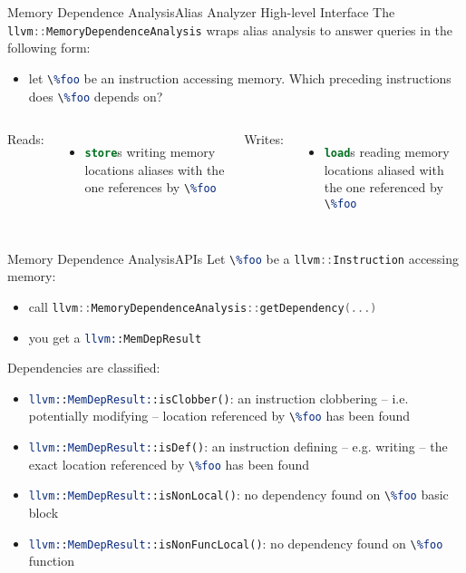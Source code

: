 \documentclass[10pt,mathserif]{beamer}
\newcommand{\cppinline}[1]{\lstinline[language=C++]!#1!}
\newcommand{\llvminline}[1]{\lstinline[language=LLVM]!#1!}
\begin{document}
\begin{frame}{Memory Dependence Analysis}{Alias Analyzer High-level Interface}
The \cppinline{llvm::MemoryDependenceAnalysis} wraps alias analysis to answer
queries in the following form:

\begin{itemize}
\item let \llvminline{\%foo} be an instruction accessing memory. Which
      preceding instructions does \llvminline{\%foo} depends on?
\end{itemize}

\begin{columns}[t]
Reads:

\begin{itemize}
\item \llvminline{store}s writing memory locations aliases with the one
      references by \llvminline{\%foo}
\end{itemize}

Writes:

\begin{itemize}
\item \llvminline{load}s reading memory locations aliased with the one
      referenced by \llvminline{\%foo}
\end{itemize}
\end{columns}
\end{frame}

\begin{frame}{Memory Dependence Analysis}{APIs}
Let \llvminline{\%foo} be a \cppinline{llvm::Instruction} accessing memory:

\begin{itemize}
\item call \cppinline{llvm::MemoryDependenceAnalysis::getDependency(...)}
\item you get a \llvminline{llvm::MemDepResult}
\end{itemize}

Dependencies are classified:

\begin{itemize}
\item \llvminline{llvm::MemDepResult::isClobber()}: an instruction clobbering --
      i.e. potentially modifying -- location referenced by \llvminline{\%foo}
      has been found
\item \llvminline{llvm::MemDepResult::isDef()}: an instruction defining -- e.g.
      writing -- the exact location referenced by \llvminline{\%foo} has been
      found
\item \llvminline{llvm::MemDepResult::isNonLocal()}: no dependency found on
      \llvminline{\%foo} basic block
\item \llvminline{llvm::MemDepResult::isNonFuncLocal()}: no dependency found on
      \llvminline{\%foo} function
\end{itemize}
\end{frame}
\end{document}
